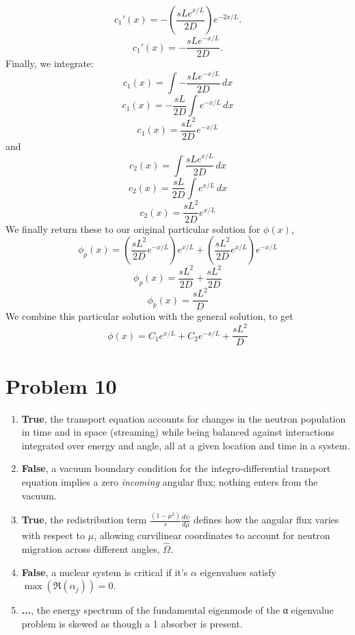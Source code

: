 \documentclass{article}
\newcommand{\Oh}{\hat{\Omega}}
\begin{document}
$$ c_1'(x) = -\left(\frac{sLe^{x/L}}{2D}\right)e^{-2x/L} .$$
$$ c_1'(x) = -\frac{sLe^{-x/L}}{2D} .$$
Finally, we integrate:
$$ c_1(x) = \int -\frac{sLe^{-x/L}}{2D}\, dx $$
$$ c_1(x) = -\frac{sL}{2D}\int e^{-x/L}\, dx $$
$$ c_1(x) = \frac{sL^2}{2D}e^{-x/L}$$
and
$$ c_2(x) = \int \frac{sLe^{x/L}}{2D}\, dx $$
$$ c_2(x) = \frac{sL}{2D}\int e^{x/L}\, dx $$
$$ c_2(x) = \frac{sL^2}{2D}e^{x/L}$$
We finally return these to our original particular solution for $\phi(x)$,
$$ \phi_p(x) = \left(\frac{sL^2}{2D}e^{-x/L}\right)e^{x/L} + \left(\frac{sL^2}{2D}e^{x/L}\right)e^{-x/L} $$
$$ \phi_p(x) = \frac{sL^2}{2D} + \frac{sL^2}{2D} $$
$$ \phi_p(x) = \frac{sL^2}{D} $$
We combine this particular solution with the general solution, to get
$$\boxed{ \phi(x) = C_1e^{x/L} + C_2e^{-x/L} + \frac{sL^2}{D} }$$




\section*{Problem 10}

\begin{enumerate}
\item \textbf{True}, the transport equation accounts for changes in the neutron population in time and in space (streaming) while being balanced against interactions integrated over energy and angle, all at a given location and time in a system.
\item \textbf{False}, a vacuum boundary condition for the integro-differential transport equation implies a zero \textit{incoming} angular flux; nothing enters from the vacuum.
\item \textbf{True}, the redistribution term $\frac{(1-\mu^2)}{r}\frac{d\psi}{d\mu}$ defines how the angular flux varies with respect to $\mu$, allowing curvilinear coordinates to account for neutron migration across different angles, $\Oh$.
\item \textbf{False}, a nuclear system is critical if it’s $\alpha$ eigenvalues satisfy $\max(\Re(\alpha_j)) = 0$.
\item \textbf{...}, the energy spectrum of the fundamental eigenmode of the α eigenvalue problem is skewed as though a 1 absorber is present.
\end{enumerate}





\end{document}
